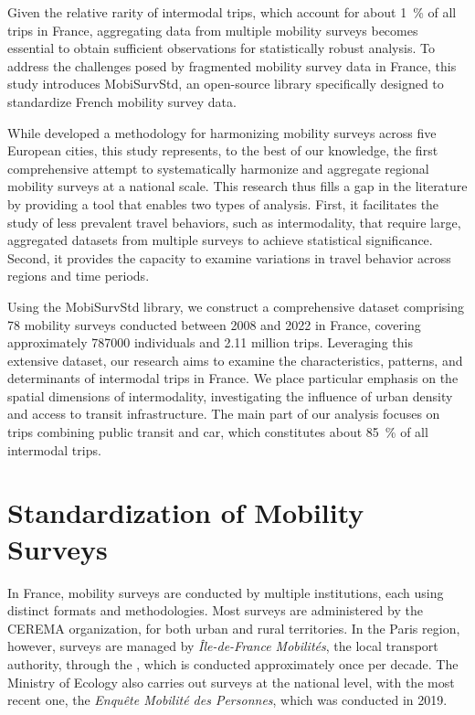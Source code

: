 \documentclass[3p,times,procedia]{elsarticle}
\begin{document}
Given the relative rarity of intermodal trips, which account for about \SI{1}{\%} of all trips in France, aggregating data from multiple mobility surveys becomes essential to obtain sufficient observations for statistically robust analysis.
To address the challenges posed by fragmented mobility survey data in France, this study introduces MobiSurvStd, an open-source library specifically designed to standardize French mobility survey data.

While \citet{Wittwer2018} developed a methodology for harmonizing mobility surveys across five European cities, this study represents, to the best of our knowledge, the first comprehensive attempt to systematically harmonize and aggregate regional mobility surveys at a national scale.
This research thus fills a gap in the literature by providing a tool that enables two types of analysis.
First, it facilitates the study of less prevalent travel behaviors, such as intermodality, that require large, aggregated datasets from multiple surveys to achieve statistical significance.
Second, it provides the capacity to examine variations in travel behavior across regions and time periods.

Using the MobiSurvStd library, we construct a comprehensive dataset comprising 78 mobility surveys conducted between 2008 and 2022 in France, covering approximately \num{787000} individuals and 2.11 million trips.
Leveraging this extensive dataset, our research aims to examine the characteristics, patterns, and determinants of intermodal trips in France.
We place particular emphasis on the spatial dimensions of intermodality, investigating the influence of urban density and access to transit infrastructure.
The main part of our analysis focuses on trips combining public transit and car, which constitutes about \SI{85}{\%} of all intermodal trips.

\section{Standardization of Mobility Surveys}

In France, mobility surveys are conducted by multiple institutions, each using distinct formats and methodologies.
Most surveys are administered by the CEREMA organization, for both urban and rural territories.
In the Paris region, however, surveys are managed by \emph{Île-de-France Mobilités}, the local transport authority, through the \citet{EGT2010}, which is conducted approximately once per decade.
The Ministry of Ecology also carries out surveys at the national level, with the most recent one, the \emph{Enquête Mobilité des Personnes}, which was conducted in 2019.
\end{document}
